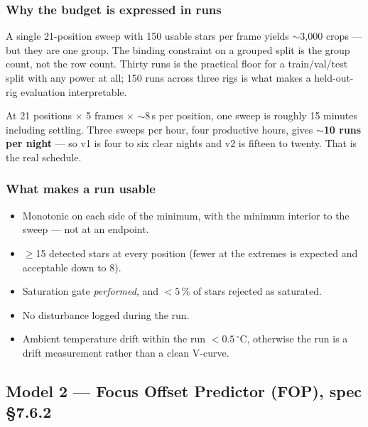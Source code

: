 \documentclass[11pt]{article}
\begin{document}
\subsubsection*{Why the budget is expressed in runs}

A single 21-position sweep with 150 usable stars per frame yields
$\sim$3,000 crops --- but they are one group. The binding constraint on a
grouped split is the group count, not the row count. Thirty runs is the
practical floor for a train/val/test split with any power at all; 150 runs
across three rigs is what makes a held-out-rig evaluation interpretable.

At 21 positions $\times$ 5 frames $\times$ $\sim$8\,s per position, one sweep is
roughly 15 minutes including settling. Three sweeps per hour, four productive
hours, gives \textbf{$\sim$10 runs per night} --- so v1 is four to six clear
nights and v2 is fifteen to twenty. That is the real schedule.

\subsubsection*{What makes a run usable}

\begin{itemize}
\item Monotonic on each side of the minimum, with the minimum interior to the
      sweep --- not at an endpoint.
\item $\geq$15 detected stars at every position (fewer at the extremes is
      expected and acceptable down to 8).
\item Saturation gate \emph{performed}, and $<5\,\%$ of stars rejected as
      saturated.
\item No disturbance logged during the run.
\item Ambient temperature drift within the run $<0.5\,^\circ$C, otherwise the
      run is a drift measurement rather than a clean V-curve.
\end{itemize}

\subsection{Model 2 --- Focus Offset Predictor (FOP), spec \S7.6.2}\label{m:fop}
\end{document}
